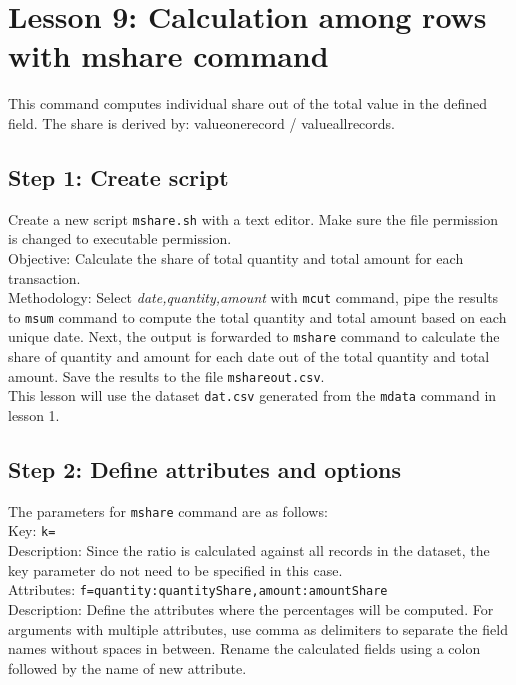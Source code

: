 

%


\section{Lesson 9: Calculation among rows with mshare command}

This command computes individual share out of the total value in the defined field.  The share is derived by: valueonerecord / valueallrecords.



\subsection{Step 1: Create script}

Create a new script \verb|mshare.sh| with a text editor. Make sure the file permission is changed to executable permission. \\

Objective:  Calculate the share of total quantity and total amount for each transaction. \\

Methodology: Select \emph{date,quantity,amount} with \verb|mcut| command, pipe the results to \verb|msum| command to compute the total quantity and total amount based on each unique date. Next, the output is forwarded to \verb|mshare| command to calculate the share of quantity and amount for each date out of the total quantity and total amount. Save the results to the file \verb|mshareout.csv|.   \\

This lesson will use the dataset \verb|dat.csv| generated from the \verb|mdata| command in lesson 1. 

 \subsection{Step 2: Define attributes and options }

{\setlength{\parindent}{0cm}

The parameters for \verb|mshare| command are as follows: \\

Key: 		\verb|k=| \\
Description: 	Since the ratio is calculated against all records in the dataset, the key parameter do not need to be specified in this case. \\

Attributes: 	\verb|f=quantity:quantityShare,amount:amountShare|\\
Description: 	Define the attributes where the percentages will be computed. For arguments with multiple attributes, use comma as delimiters to separate the field names without spaces in between. Rename the calculated fields using a colon followed by the name of new attribute. 
}

